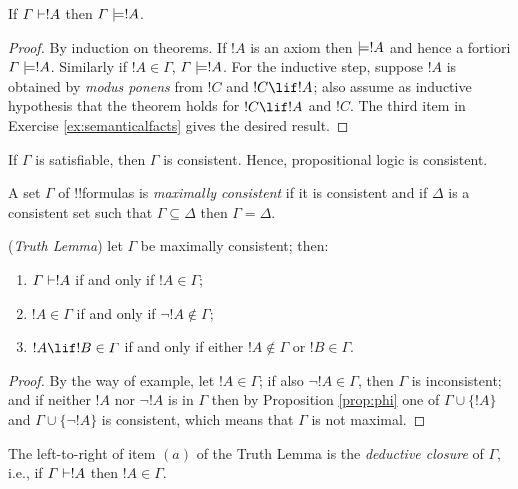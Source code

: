 \documentclass[../../include/open-logic-section]{subfiles}
\begin{document}


\begin{thm}[Soundness]  If $\Gamma\Proves!A$ then
$\Gamma \Entails !A$. \end{thm}

\begin{proof} By induction on theorems. If $!A$ is an axiom then $\Entails
!A$ and hence a fortiori $\Gamma \Entails!A$. Similarly if $!A \in \Gamma$,
$\Gamma \Entails!A$. For the inductive step, suppose $!A$ is obtained by
\emph{modus ponens} from $!C$ and $!C\lif!A$; also assume as inductive
hypothesis that the theorem holds for $!C\lif !A$ and $!C$. The third item
in Exercise \ref{ex:semanticalfacts} gives the desired result. \end{proof}

\begin{cor} If $\Gamma$ is satisfiable, then $\Gamma$ is consistent. Hence,
propositional logic is consistent. \end{cor}

\begin{defn}  A set $\Gamma$ of !!{formula}s is
\emph{maximally consistent} if it is consistent and if $\Delta$ is a
consistent set such that $\Gamma \subseteq \Delta$ then $\Gamma = \Delta$.
\end{defn}

\begin{prop} (\emph{Truth Lemma}) let $\Gamma$ be maximally consistent;
then: \begin{enumerate} \item $\Gamma\Proves!A$ if and only if
$!A\in\Gamma$; \item $!A\in\Gamma$ if and only if $\lnot!A\notin\Gamma$;
\item $!A\lif!B \in\Gamma$ if and only if either $!A\notin\Gamma$ or
$!B\in\Gamma$. \end{enumerate} \end{prop} \begin{proof} By the way of
example, let $!A\in\Gamma$; if also $\lnot!A\in\Gamma$, then $\Gamma$ is
inconsistent; and if neither $!A$ nor $\lnot!A$ is in $\Gamma$ then by
Proposition \ref{prop:phi} one of $\Gamma\cup\{!A\}$ and
$\Gamma\cup\{\lnot!A\}$ is consistent, which means that $\Gamma$ is not
maximal. \end{proof}

\noindent The left-to-right of item $(a)$ of the Truth Lemma is the
\emph{deductive closure} of $\Gamma$, i.e., if $\Gamma \Proves !A$ then $!A
\in \Gamma$.
\end{document}
